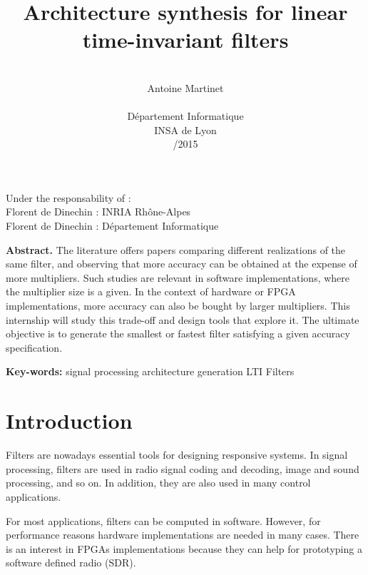 \documentclass[twoside]{article}
\title{\vspace{-40pt}
	\fontsize{14}{16.8}\selectfont
	\textbf{Architecture synthesis for linear time-invariant filters}}
\author{\\ \fontsize{10}{12}\selectfont Antoine Martinet \\\\ \fontsize{9}{10.8}\selectfont Département Informatique \\ \fontsize{9}{10.8}\selectfont INSA de Lyon \\ \fontsize{9}{10.8}\selectfont 2014/2015}
\date{}
\theoremstyle{remark}
\numberwithin{equation}{subsection}
\newcommand{\TODO}{\textbf{TODO}}
\begin{document}
\maketitle
\noindent Under the responsability of : \\
Florent de Dinechin : INRIA Rhône-Alpes \\
Florent de Dinechin : Département Informatique
\vspace{20pt}

\begingroup

	\fontsize{9}{10.8}\selectfont
	\rightskip\leftskip
	\noindent \textbf{Abstract.}
	The literature offers papers comparing different realizations of the same filter,
	and observing that more accuracy can be obtained at the expense of more multipliers.
	Such studies are relevant in software implementations, where the multiplier size is a given.
	In the context of hardware or FPGA implementations, more accuracy can also be bought by larger multipliers.
	This internship will study this trade-off and design tools that explore it.
	The ultimate objective is to generate the smallest or fastest filter satisfying a given accuracy specification.

	\vspace{20pt}

\endgroup
	
	\noindent \textbf{Key-words:}
	signal processing
	architecture generation
	LTI Filters


\section{ Introduction }

	Filters are nowadays essential tools for designing responsive systems.
	In signal processing, filters are used in
	radio signal coding and decoding, image and sound processing, and so on.
	In addition, they are also used in many control applications.



	For most applications, filters can be computed in software.
	However, for performance reasons hardware implementations are needed in many cases.
	There is an interest in FPGAs implementations because they can help for prototyping a software defined radio (SDR).
\end{document}
